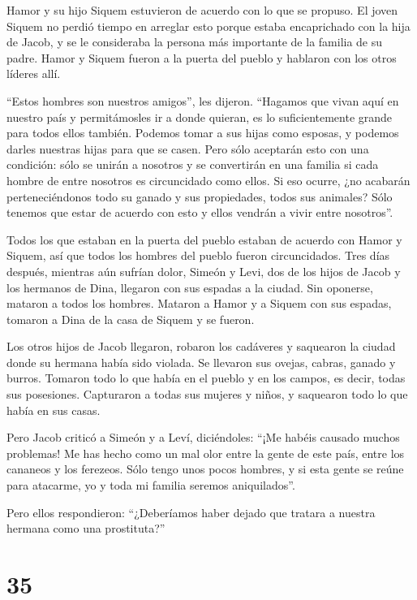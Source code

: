  Hamor y su hijo Siquem estuvieron de acuerdo con lo que se
propuso.  El joven Siquem no perdió tiempo en arreglar esto
porque estaba encaprichado con la hija de Jacob, y se le consideraba la
persona más importante de la familia de su padre.  Hamor y
Siquem fueron a la puerta del pueblo y hablaron con los otros líderes
allí.

 ``Estos hombres son nuestros amigos'', les dijeron.
``Hagamos que vivan aquí en nuestro país y permitámosles ir a donde
quieran, es lo suficientemente grande para todos ellos también. Podemos
tomar a sus hijas como esposas, y podemos darles nuestras hijas para que
se casen.  Pero sólo aceptarán esto con una condición: sólo
se unirán a nosotros y se convertirán en una familia si cada hombre de
entre nosotros es circuncidado como ellos.  Si eso ocurre,
¿no acabarán perteneciéndonos todo su ganado y sus propiedades, todos
sus animales? Sólo tenemos que estar de acuerdo con esto y ellos vendrán
a vivir entre nosotros''.

 Todos los que estaban en la puerta del pueblo estaban de
acuerdo con Hamor y Siquem, así que todos los hombres del pueblo fueron
circuncidados.  Tres días después, mientras aún sufrían
dolor, Simeón y Levi, dos de los hijos de Jacob y los hermanos de Dina,
llegaron con sus espadas a la ciudad. Sin oponerse, mataron a todos los
hombres.  Mataron a Hamor y a Siquem con sus espadas,
tomaron a Dina de la casa de Siquem y se fueron.

 Los otros hijos de Jacob llegaron, robaron los cadáveres y
saquearon la ciudad donde su hermana había sido violada. 
Se llevaron sus ovejas, cabras, ganado y burros. Tomaron todo lo que
había en el pueblo y en los campos,  es decir, todas sus
posesiones. Capturaron a todas sus mujeres y niños, y saquearon todo lo
que había en sus casas.

 Pero Jacob criticó a Simeón y a Leví, diciéndoles: ``¡Me
habéis causado muchos problemas! Me has hecho como un mal olor entre la
gente de este país, entre los cananeos y los ferezeos. Sólo tengo unos
pocos hombres, y si esta gente se reúne para atacarme, yo y toda mi
familia seremos aniquilados''.

 Pero ellos respondieron: ``¿Deberíamos haber dejado que
tratara a nuestra hermana como una prostituta?''

\hypertarget{section-34}{%
\section{35}\label{section-34}}


